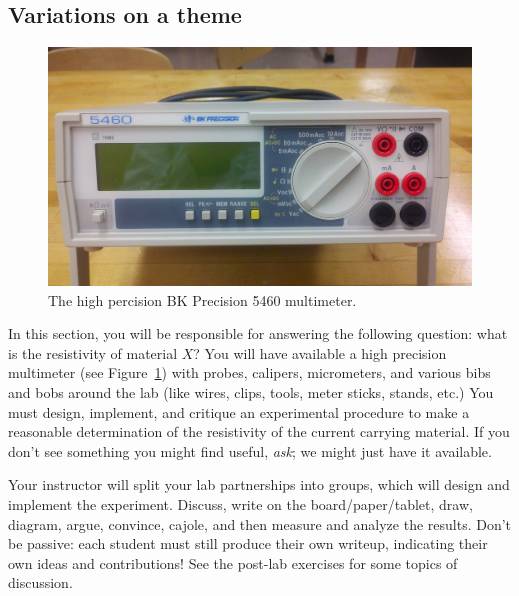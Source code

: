 \documentclass[12pt]{article}
\begin{document}
\subsection{Variations on a theme}
\label{sec:variations}

\begin{figure}
  \centering
  \includegraphics[width=2\textwidth/3]{figures/bk_5460}
  \caption{The high percision BK Precision 5460 multimeter.}
  \label{fig:multimeter}
\end{figure}
In this section, you will be responsible for answering the following
question: what is the resistivity of material $X$?  You will have
available a high precision multimeter (see
Figure~\ref{fig:multimeter}) with probes, calipers, micrometers, and
various bibs and bobs around the lab (like wires, clips, tools, meter
sticks, stands, etc.)  You must design, implement, and critique an
experimental procedure to make a reasonable determination of the
resistivity of the current carrying material.  If you don't see
something you might find useful, \textit{ask}; we might just have it
available.

Your instructor will split your lab partnerships into groups, which
will design and implement the experiment.  Discuss, write on the
board/paper/tablet, draw, diagram, argue, convince, cajole, and then
measure and analyze the results.  Don't be passive: each student must
still produce their own writeup, indicating their own ideas and
contributions!  See the post-lab exercises for some topics of
discussion.
\end{document}
